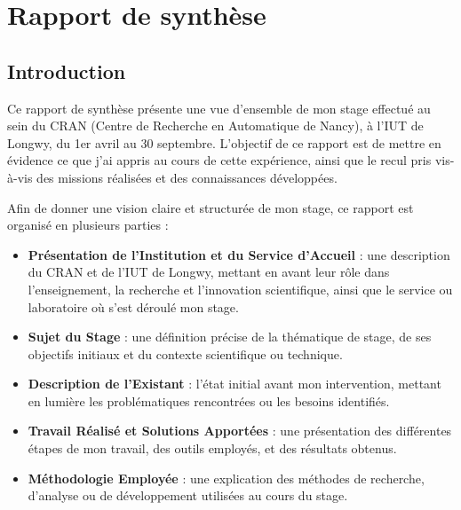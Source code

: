 \documentclass{name}
\begin{document}
\newpage
\section{Rapport de synthèse}

\subsection{Introduction}
Ce rapport de synthèse présente une vue d'ensemble de mon stage effectué au sein du CRAN (Centre de Recherche en Automatique de Nancy), à l'IUT de Longwy, du 1er avril au 30 septembre. L'objectif de ce rapport est de mettre en évidence ce que j'ai appris au cours de cette expérience, ainsi que le recul pris vis-à-vis des missions réalisées et des connaissances développées.

Afin de donner une vision claire et structurée de mon stage, ce rapport est organisé en plusieurs parties :

\begin{itemize}
  \item \textbf{Présentation de l'Institution et du Service d'Accueil} : une description du CRAN et de l'IUT de Longwy, mettant en avant leur rôle dans l'enseignement, la recherche et l'innovation scientifique, ainsi que le service ou laboratoire où s'est déroulé mon stage.

  \item \textbf{Sujet du Stage} : une définition précise de la thématique de stage, de ses objectifs initiaux et du contexte scientifique ou technique.

  \item \textbf{Description de l'Existant} : l'état initial avant mon intervention, mettant en lumière les problématiques rencontrées ou les besoins identifiés.

  \item \textbf{Travail Réalisé et Solutions Apportées} : une présentation des différentes étapes de mon travail, des outils employés, et des résultats obtenus.

  \item \textbf{Méthodologie Employée} : une explication des méthodes de recherche, d'analyse ou de développement utilisées au cours du stage.
\end{itemize}
\end{document}
